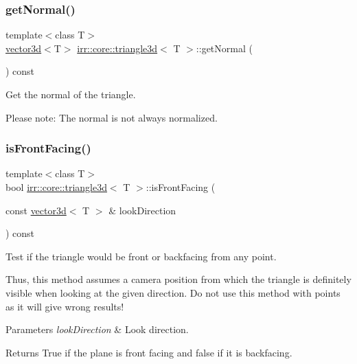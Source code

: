 \subsubsection{\texorpdfstring{get\+Normal()}{getNormal()}\hspace{0.1cm}{\footnotesize\ttfamily [2/2]}}
{\footnotesize\ttfamily template$<$class T$>$ \\
\hyperlink{classirr_1_1core_1_1vector3d}{vector3d}$<$T$>$ \hyperlink{classirr_1_1core_1_1triangle3d}{irr\+::core\+::triangle3d}$<$ T $>$\+::get\+Normal (\begin{DoxyParamCaption}{ }\end{DoxyParamCaption}) const\hspace{0.3cm}{\ttfamily [inline]}}



Get the normal of the triangle. 

Please note\+: The normal is not always normalized. \mbox{\label{classirr_1_1core_1_1triangle3d_a9befd6b07fc8067d16cf313b35b835db}} 
\subsubsection{\texorpdfstring{is\+Front\+Facing()}{isFrontFacing()}\hspace{0.1cm}{\footnotesize\ttfamily [1/2]}}
{\footnotesize\ttfamily template$<$class T$>$ \\
bool \hyperlink{classirr_1_1core_1_1triangle3d}{irr\+::core\+::triangle3d}$<$ T $>$\+::is\+Front\+Facing (\begin{DoxyParamCaption}\item[{const \hyperlink{classirr_1_1core_1_1vector3d}{vector3d}$<$ T $>$ \&}]{look\+Direction }\end{DoxyParamCaption}) const\hspace{0.3cm}{\ttfamily [inline]}}



Test if the triangle would be front or backfacing from any point. 

Thus, this method assumes a camera position from which the triangle is definitely visible when looking at the given direction. Do not use this method with points as it will give wrong results! 
\begin{DoxyParams}{Parameters}
{\em look\+Direction} & Look direction. \\
\hline
\end{DoxyParams}
\begin{DoxyReturn}{Returns}
True if the plane is front facing and false if it is backfacing. 
\end{DoxyReturn}
\mbox{\label{classirr_1_1core_1_1triangle3d_a9befd6b07fc8067d16cf313b35b835db}} 

